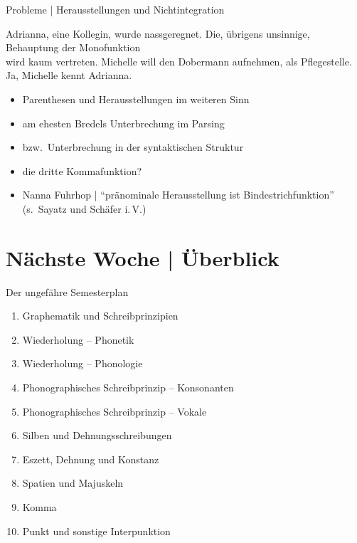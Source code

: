 \begin{frame}
  {Probleme | Herausstellungen und Nichtintegration}
  \onslide<+->
  \onslide<+->
  \begin{exe}
    \ex Adrianna, \alert{eine Kollegin}, wurde nassgeregnet.
    \ex Die, \alert{übrigens unsinnige}, Behauptung der Monofunktion\\
    wird kaum vertreten.
    \ex Michelle will den Dobermann aufnehmen, \alert{als Pflegestelle}.
    \ex \alert{Ja}, Michelle kennt Adrianna.
  \end{exe}
  \onslide<+->
  \Halbzeile
  \begin{itemize}[<+->]
    \item \alert{Parenthesen} und \alert{Herausstellungen} im weiteren Sinn
    \item am ehesten Bredels Unterbrechung im Parsing
    \item bzw.\ \alert{Unterbrechung in der syntaktischen Struktur}
    \item die \alert{dritte Kommafunktion}?
      \Halbzeile
    \item Nanna Fuhrhop | "`pränominale Herausstellung ist Bindestrichfunktion"'\\
       (s.\ Sayatz und Schäfer i.\,V.)
  \end{itemize}
\end{frame}

\ifdefined\TITLE
  \section{Nächste Woche | Überblick}

  \begin{frame}
    {Der ungefähre Semesterplan}
    \begin{enumerate}[<+->]
      \item Graphematik und Schreibprinzipien
      \item Wiederholung -- Phonetik
      \item Wiederholung -- Phonologie
      \item Phonographisches Schreibprinzip -- Konsonanten
      \item Phonographisches Schreibprinzip -- Vokale
      \item Silben und Dehnungsschreibungen
      \item Eszett, Dehnung und Konstanz
      \item Spatien und Majuskeln
      \item Komma
      \item \alert{Punkt und sonstige Interpunktion}
    \end{enumerate}
  \end{frame}
\fi
